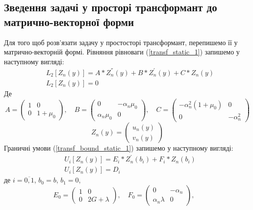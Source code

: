 \subsection{Зведення задачі у просторі трансформант до матрично-векторної форми}
Для того щоб розв'язати задачу у простосторі трансформант, перепишемо її у матрично-векторній формі.
Рівняння рівноваги (\ref{transf_static_1}) запишемо у наступному вигляді:
\begin{align}\label{transf_mat_static_1}
    &L_2\left[ Z_n(y) \right] = A * Z_n^{''}(y) + B * Z_n^{'}(y) + C * Z_n(y) \nonumber \\
    & L_2\left[ Z_n(y) \right] = 0
\end{align}
Де
\begin{equation*}
    A = \begin{pmatrix}
        1 & 0 \\
        0 & 1 + \mu_0
    \end{pmatrix}, \quad
    B = \begin{pmatrix}
        0 & -\alpha_n \mu_0 \\
        \alpha_n \mu_0 & 0
    \end{pmatrix}, \quad
    C = \begin{pmatrix}
        -\alpha_n^2(1 + \mu_0) & 0 \\
        0 & -\alpha_n^2
    \end{pmatrix}
\end{equation*}
\begin{equation*}
    Z_n(y) = \begin{pmatrix}
        u_n(y) \\
        v_n(y)
    \end{pmatrix}
\end{equation*}
Граничні умови (\ref{transf_bound_static_1}) запишемо у наступному вигляді:
\begin{align}\label{transf_bound_mat_static_1}
    &U_i\left[ Z_n(y) \right] = E_i * Z_n^{'}(b_i) + F_i * Z_n(b_i) \nonumber \\
    & U_i\left[ Z_n(y) \right] = D_i
\end{align}
де $i = \overline{0, 1}$, $b_0 = b$, $b_1 = 0$,
\begin{equation*}
    E_0 = \begin{pmatrix}
        1 & 0 \\
        0 & 2G + \lambda
    \end{pmatrix}, \quad
    F_0 = \begin{pmatrix}
        0 & -\alpha_n \\
        \alpha_n \lambda & 0
    \end{pmatrix}, \quad
\end{equation*}
